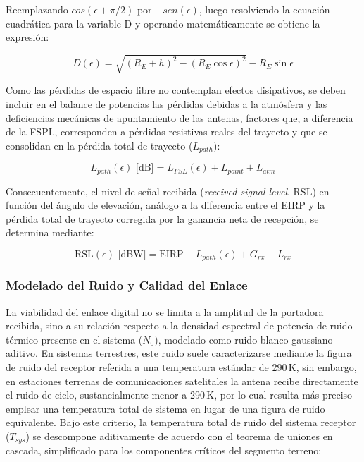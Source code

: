 Reemplazando $cos(\epsilon+\pi/2)$ por $-sen(\epsilon)$, luego resolviendo la ecuación cuadrática para la variable D y operando matemáticamente se obtiene la expresión:

\begin{equation}
    D(\epsilon) = \sqrt{(R_E + h)^2 - (R_E \cos\epsilon)^2} - R_E \sin\epsilon
    \label{eq:geometria_orbita}
\end{equation}

Como las pérdidas de espacio libre no contemplan efectos disipativos, se deben incluir en el balance de potencias las pérdidas debidas a la atmósfera y las deficiencias mecánicas de apuntamiento de las antenas, factores que, a diferencia de la FSPL, corresponden a pérdidas resistivas reales del trayecto y que se consolidan en la pérdida total de trayecto ($L_{path}$):

\begin{equation}
    L_{path}(\epsilon) \text{ [dB]} = L_{FSL}(\epsilon) + L_{point} + L_{atm}
    \label{eq:pérdidas_totales}
\end{equation}

Consecuentemente, el nivel de señal recibida (\textit{received signal level}, RSL) en función del ángulo de elevación, análogo a la diferencia entre el EIRP y la pérdida total de trayecto corregida por la ganancia neta de recepción, se determina mediante:

\begin{equation}
    \text{RSL}(\epsilon) \text{ [dBW]} = \text{EIRP} - L_{path}(\epsilon) + G_{rx} - L_{rx}
    \label{eq:rsl_formal}
\end{equation}

\subsubsection{Modelado del Ruido y Calidad del Enlace}
La viabilidad del enlace digital no se limita a la amplitud de la portadora recibida, sino a su relación respecto a la densidad espectral de potencia de ruido térmico presente en el sistema ($N_0$), modelado como ruido blanco gaussiano aditivo. En sistemas terrestres, este ruido suele caracterizarse mediante la figura de ruido del receptor referida a una temperatura estándar de 290\,K, sin embargo, en estaciones terrenas de comunicaciones satelitales la antena recibe directamente el ruido de cielo, sustancialmente menor a 290\,K, por lo cual resulta más preciso emplear una temperatura total de sistema en lugar de una figura de ruido equivalente. Bajo este criterio, la temperatura total de ruido del sistema receptor ($T_{sys}$) se descompone aditivamente de acuerdo con el teorema de uniones en cascada, simplificado para los componentes críticos del segmento terreno:

